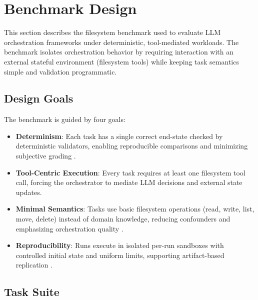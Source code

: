 \section{Benchmark Design}
\label{sec:benchmark_design}

This section describes the filesystem benchmark used to evaluate LLM orchestration frameworks under deterministic, tool-mediated workloads. The benchmark isolates orchestration behavior by requiring interaction with an external stateful environment (filesystem tools) while keeping task semantics simple and validation programmatic.

\subsection{Design Goals}

The benchmark is guided by four goals:
\begin{itemize}
    \item \textbf{Determinism}: Each task has a single correct end-state checked by deterministic validators, enabling reproducible comparisons and minimizing subjective grading \cite{gray1993benchmark, wilson2014best}.
    \item \textbf{Tool-Centric Execution}: Every task requires at least one filesystem tool call, forcing the orchestrator to mediate LLM decisions and external state updates.
    \item \textbf{Minimal Semantics}: Tasks use basic filesystem operations (read, write, list, move, delete) instead of domain knowledge, reducing confounders and emphasizing orchestration quality \cite{gray1993benchmark}.
    \item \textbf{Reproducibility}: Runs execute in isolated per-run sandboxes with controlled initial state and uniform limits, supporting artifact-based replication \cite{wilson2014best}.
\end{itemize}

\subsection{Task Suite}

